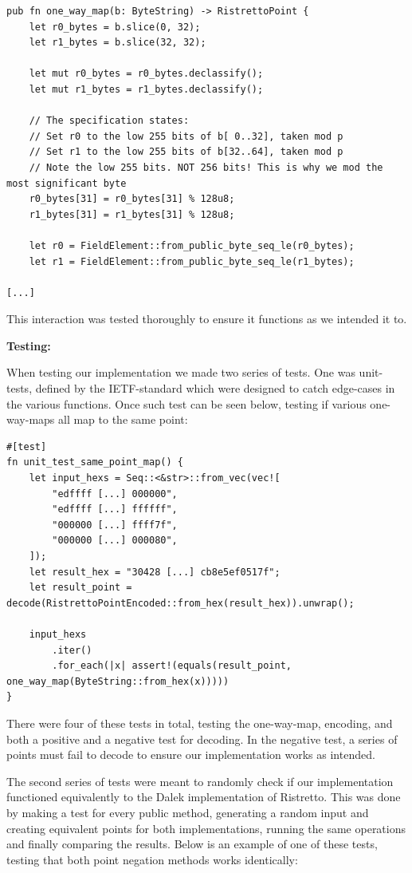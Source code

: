 \documentclass{article}
\begin{document}
\begin{lstlisting}
pub fn one_way_map(b: ByteString) -> RistrettoPoint {
	let r0_bytes = b.slice(0, 32);
	let r1_bytes = b.slice(32, 32);

	let mut r0_bytes = r0_bytes.declassify();
	let mut r1_bytes = r1_bytes.declassify();

	// The specification states:
	// Set r0 to the low 255 bits of b[ 0..32], taken mod p
	// Set r1 to the low 255 bits of b[32..64], taken mod p
	// Note the low 255 bits. NOT 256 bits! This is why we mod the most significant byte
	r0_bytes[31] = r0_bytes[31] % 128u8;
	r1_bytes[31] = r1_bytes[31] % 128u8;

	let r0 = FieldElement::from_public_byte_seq_le(r0_bytes);
	let r1 = FieldElement::from_public_byte_seq_le(r1_bytes);

[...]
\end{lstlisting}

This interaction was tested thoroughly to ensure it functions as we 
intended it to.

\textbf{Testing:}

When testing our implementation we made two series of tests. 
One was unit-tests, defined by the IETF-standard which were designed 
to catch edge-cases in the various functions. Once such test can be 
seen below, testing if various one-way-maps all map to the same point:

\begin{lstlisting}
#[test]
fn unit_test_same_point_map() {
	let input_hexs = Seq::<&str>::from_vec(vec![
		"edffff [...] 000000",
		"edffff [...] ffffff",
		"000000 [...] ffff7f",
		"000000 [...] 000080",
	]);
	let result_hex = "30428 [...] cb8e5ef0517f";
	let result_point = decode(RistrettoPointEncoded::from_hex(result_hex)).unwrap();

	input_hexs
		.iter()
		.for_each(|x| assert!(equals(result_point, one_way_map(ByteString::from_hex(x)))))
}
\end{lstlisting}

There were four of these tests in total, testing the one-way-map,
encoding, and both a positive and a negative test for decoding.  In the
negative test, a series of points must fail to decode to ensure our
implementation works as intended.

The second series of tests were meant to randomly check if our
implementation functioned equivalently to the Dalek implementation
of Ristretto. This was done by making a test for every public
method, generating a random input and creating equivalent points
for both implementations, running the same operations and finally
comparing the results. Below is an example of one of these tests,
testing that both point negation methods works identically:
\end{document}
